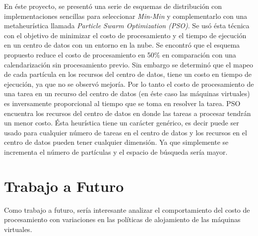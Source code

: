 \documentclass[jou,apacite]{apa6}
\begin{document}
En éste proyecto, se presentó una serie de esquemas de distribución con implementaciones sencillas para seleccionar \textit{Min-Min} y complementarlo con una metaheurística  llamada \textit{Particle Swarm Optimization (PSO)}. Se usó ésta técnica con el objetivo de minimizar el costo de procesamiento y el tiempo de ejecución en un centro de datos con un entorno en la nube. Se encontró que el esquema propuesto reduce el costo de procesamiento en 50\% en comparación con una calendarización sin procesamiento previo. Sin embargo se determinó que el mapeo de cada partícula en los recursos del centro de datos, tiene un costo en tiempo de ejecución, ya que no se observó mejoría. Por lo tanto el costo de procesamiento de una tarea en un recurso del centro de datos (en éste caso las máquinas virtuales) es inversamente proporcional al tiempo que se toma en resolver la tarea.
PSO encuentra los recursos del centro de datos en donde las tareas a procesar tendrán un menor costo. Ésta heurística tiene un carácter genérico, es decir puede ser usado para cualquier número de tareas en el centro de datos y los recursos en el centro de datos pueden tener cualquier dimensión. Ya que simplemente se incrementa el número de partículas y el espacio de búsqueda sería mayor.

\section{Trabajo a Futuro}

Como trabajo a futuro, sería interesante analizar el comportamiento del costo de procesamiento con variaciones en las políticas de alojamiento de las máquinas virtuales.


\end{document}
